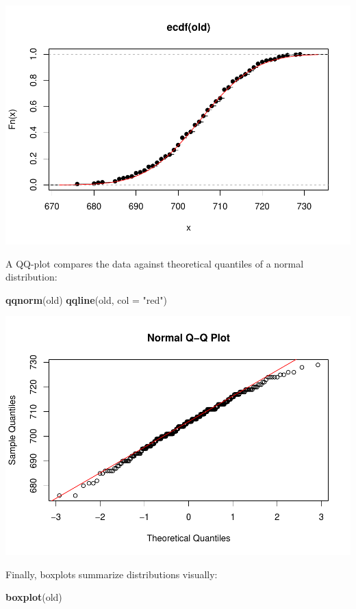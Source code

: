 \documentclass[
]{article}
\newenvironment{Shaded}{\begin{snugshade}}{\end{snugshade}}
\newcommand{\AttributeTok}[1]{\textcolor[rgb]{0.13,0.29,0.53}{#1}}
\newcommand{\FunctionTok}[1]{\textcolor[rgb]{0.13,0.29,0.53}{\textbf{#1}}}
\newcommand{\NormalTok}[1]{#1}
\newcommand{\StringTok}[1]{\textcolor[rgb]{0.31,0.60,0.02}{#1}}
\begin{document}
\includegraphics{EDA_files/figure-latex/unnamed-chunk-20-1.pdf}

A QQ-plot compares the data against theoretical quantiles of a normal
distribution:

\begin{Shaded}
\begin{Highlighting}[]
\FunctionTok{qqnorm}\NormalTok{(old)}
\FunctionTok{qqline}\NormalTok{(old, }\AttributeTok{col =} \StringTok{"red"}\NormalTok{)}
\end{Highlighting}
\end{Shaded}

\includegraphics{EDA_files/figure-latex/unnamed-chunk-21-1.pdf}

Finally, boxplots summarize distributions visually:

\begin{Shaded}
\begin{Highlighting}[]
\FunctionTok{boxplot}\NormalTok{(old)}
\end{Highlighting}
\end{Shaded}
\end{document}
